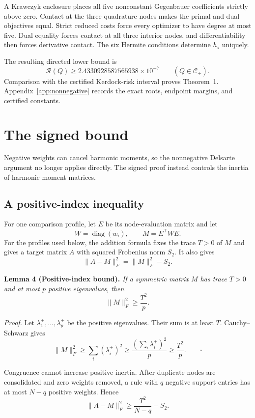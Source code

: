 \documentclass[11pt]{article}
\begin{document}
A Krawczyk enclosure places all five nonconstant Gegenbauer coefficients
strictly above zero. Contact at the three quadrature nodes makes the
primal and dual objectives equal. Strict reduced costs force every
optimizer to have degree at most five. Dual equality forces contact at all
three interior nodes, and differentiability then forces derivative
contact. The six Hermite conditions determine \(h_\star\) uniquely.

The resulting directed lower bound is
\[
\mathcal{R}(Q)
\geq 2.4330928587565938\times10^{-7}
\qquad (Q\in\mathcal{C}_{+}).
\]
Comparison with the certified Kerdock-risk interval proves Theorem~1.
Appendix~\ref{app:nonnegative} records the exact roots, endpoint margins,
and certified constants.

\section{The signed bound}\label{the-signed-bound}

Negative weights can cancel harmonic moments, so the nonnegative Delsarte
argument no longer applies directly. The signed proof instead controls the
inertia of harmonic moment matrices.

\subsection{A positive-index inequality}\label{a-positive-index-inequality}

For one comparison profile, let \(E\) be its node-evaluation matrix and
let
\[
W=\operatorname{diag}(w_i),
\qquad
M=E^\top W E.
\]
For the profiles used below, the addition formula fixes the trace
\(T>0\) of \(M\) and gives a target matrix \(A\) with squared Frobenius
norm \(S_2\). It also gives
\[
\lVert A-M\rVert_F^2=\lVert M\rVert_F^2-S_2.
\]

\textbf{Lemma 4 (Positive-index bound).}
\emph{If a symmetric matrix \(M\) has trace \(T>0\) and at most \(p\)
positive eigenvalues, then}
\[
\lVert M\rVert_F^2\geq\frac{T^2}{p}.
\]

\emph{Proof.} Let \(\lambda_1^+,\ldots,\lambda_p^+\) be the positive
eigenvalues. Their sum is at least \(T\). Cauchy--Schwarz gives
\[
\lVert M\rVert_F^2
\geq\sum_i(\lambda_i^+)^2
\geq\frac{(\sum_i\lambda_i^+)^2}{p}
\geq\frac{T^2}{p}.
\qquad\square
\]

Congruence cannot increase positive inertia. After duplicate nodes are
consolidated and zero weights removed, a rule with \(q\) negative support
entries has at most \(N-q\) positive weights. Hence
\[
\lVert A-M\rVert_F^2
\geq\frac{T^2}{N-q}-S_2.
\]
\end{document}
